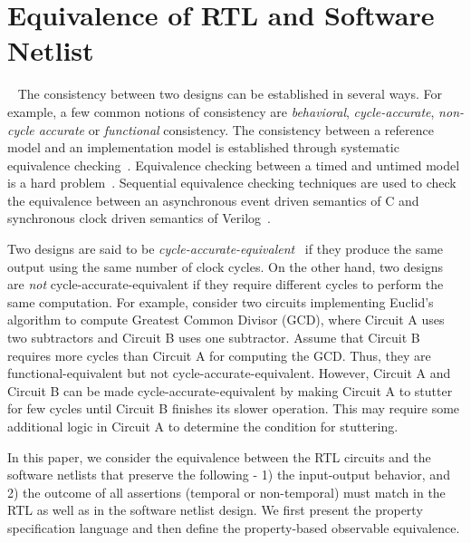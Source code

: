 \section{Equivalence of RTL and Software Netlist}~\label{sec:props}
%
The consistency between two designs can be established in several ways. 
For example, a few common notions of consistency are \emph{behavioral}, 
\emph{cycle-accurate}, \emph{non-cycle accurate} or \emph{functional}
consistency.  The consistency between a reference model and an implementation
model is established through systematic equivalence 
checking~\cite{CKY03,DBLP:conf/date/KoelblJJP09,DBLP:journals/tcad/StoffelK04,
DBLP:conf/date/Eijk98,DBLP:conf/iccd/BaumgartnerMPKJ06}.  Equivalence checking between a timed and untimed model is a hard
problem~\cite{kuehlmann2002combinational}.  Sequential equivalence checking techniques 
are used to check the equivalence between an asynchronous event driven semantics of C and synchronous 
clock driven semantics of Verilog~\cite{CKY03, DBLP:conf/iccd/BaumgartnerMPKJ06}.


Two designs are said to be \emph{cycle-accurate-equivalent}~\cite{cycle,kuehlmann2002combinational} 
if they produce the same output using the same number of clock cycles.   
On the other hand, two designs are \emph{not} cycle-accurate-equivalent if they require 
different cycles to perform the same computation. For example, consider two circuits
implementing Euclid's algorithm to compute Greatest Common Divisor (GCD),
where Circuit A uses two subtractors and Circuit B uses one subtractor. Assume that 
Circuit B requires more cycles than Circuit A for computing the GCD. Thus,
they are functional-equivalent but not cycle-accurate-equivalent. However,
Circuit A and Circuit B can be made cycle-accurate-equivalent by making Circuit
A to stutter for few cycles until Circuit B finishes its slower operation.  This
may require some additional logic in Circuit A to determine the condition for 
stuttering.  


In this paper, we consider the equivalence between the RTL circuits and the 
software netlists that preserve the following - 1) the input-output behavior, and 
2) the outcome of all assertions (temporal or non-temporal) must match in the RTL 
as well as in the software netlist design.  
% 
We first present the property specification language and then define the 
property-based observable equivalence. 
% 
